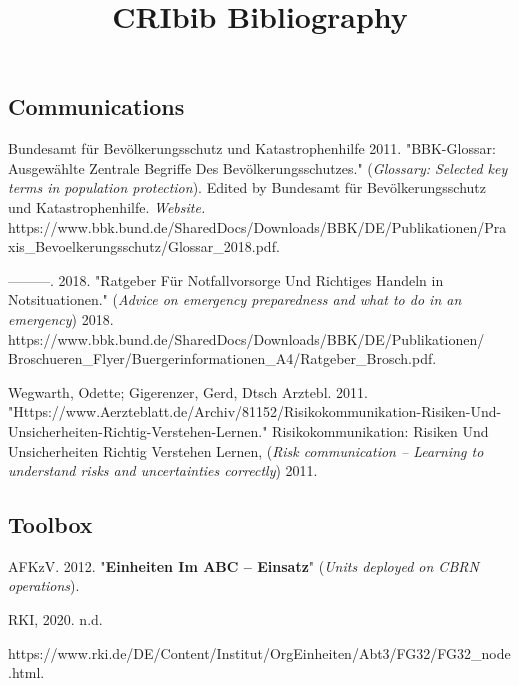 \documentclass{article}
\begin{document}
\title{CRIbib Bibliography}

\maketitle


\subsection{Communications}\label{H8291970}



Bundesamt für Bevölkerungsschutz und Katastrophenhilfe 2011. "BBK-Glossar: Ausgewählte Zentrale Begriffe Des Bevölkerungsschutzes." (\emph{Glossary: Selected key terms in population protection}). Edited by Bundesamt für Bevölkerungsschutz und Katastrophenhilfe. \emph{Website. }https://www.bbk.bund.de/SharedDocs/Downloads/BBK/DE/Publikationen/Praxis\_Bevoelkerungsschutz/Glossar\_2018.pdf.


———. 2018. "Ratgeber Für Notfallvorsorge Und Richtiges Handeln in Notsituationen." (\emph{Advice on emergency preparedness and what to do in an emergency}) 2018. https://www.bbk.bund.de/SharedDocs/Downloads/BBK/DE/Publikationen/ Broschueren\_Flyer/Buergerinformationen\_A4/Ratgeber\_Brosch.pdf.


Wegwarth, Odette; Gigerenzer, Gerd, Dtsch Arztebl. 2011. "Https://www.Aerzteblatt.de/Archiv/81152/Risikokommunikation-Risiken-Und-Unsicherheiten-Richtig-Verstehen-Lernen." Risikokommunikation: Risiken Und Unsicherheiten Richtig Verstehen Lernen, (\emph{Risk communication – Learning to understand risks and uncertainties correctly}) 2011.


\subsection{Toolbox}\label{H6136407}



AFKzV. 2012. "\textbf{Einheiten Im ABC – Einsatz}" (\emph{Units deployed on CBRN operations}).


RKI, 2020. n.d.


https://www.rki.de/DE/Content/Institut/OrgEinheiten/Abt3/FG32/FG32\_node.html.
\end{document}
